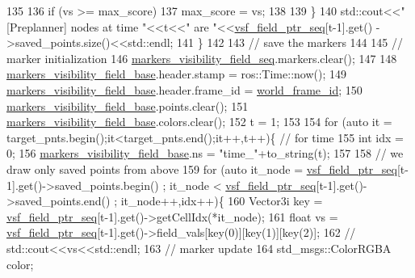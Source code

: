 \begin{DoxyCode}
135                     
136                     \textcolor{keywordflow}{if} (vs >= max\_score)
137                         max\_score = vs;
138 
139                 \}
140         std::cout<<\textcolor{stringliteral}{"[Preplanner] nodes at time "}<<t<<\textcolor{stringliteral}{" are "}<<\hyperlink{class_preplanner_aab0f91e34b86eaa581c7642ba5059308}{vsf\_field\_ptr\_seq}[t-1].get()
      ->saved\_points.size()<<std::endl;
141     \}
142 
143     \textcolor{comment}{// save the markers}
144 
145     \textcolor{comment}{// marker initialization     }
146     \hyperlink{class_preplanner_abcee90044b5d5935168ed132e3dfc8a6}{markers\_visibility\_field\_seq}.markers.clear();    
147 
148     \hyperlink{class_preplanner_a9c4d6a5e43241831b0ad11bdaf99ab16}{markers\_visibility\_field\_base}.header.stamp = ros::Time::now();
149     \hyperlink{class_preplanner_a9c4d6a5e43241831b0ad11bdaf99ab16}{markers\_visibility\_field\_base}.header.frame\_id = 
      \hyperlink{class_preplanner_a08cb79c25bd4ded139a572672e4492cd}{world\_frame\_id};
150     \hyperlink{class_preplanner_a9c4d6a5e43241831b0ad11bdaf99ab16}{markers\_visibility\_field\_base}.points.clear();
151     \hyperlink{class_preplanner_a9c4d6a5e43241831b0ad11bdaf99ab16}{markers\_visibility\_field\_base}.colors.clear();
152     t = 1;
153 
154     \textcolor{keywordflow}{for} (\textcolor{keyword}{auto} it = target\_pnts.begin();it<target\_pnts.end();it++,t++)\{ \textcolor{comment}{// for time}
155         \textcolor{keywordtype}{int} idx = 0;
156         \hyperlink{class_preplanner_a9c4d6a5e43241831b0ad11bdaf99ab16}{markers\_visibility\_field\_base}.ns = \textcolor{stringliteral}{"time\_"}+to\_string(t);
157 
158         \textcolor{comment}{// we draw only saved points from above }
159         \textcolor{keywordflow}{for} (\textcolor{keyword}{auto} it\_node = \hyperlink{class_preplanner_aab0f91e34b86eaa581c7642ba5059308}{vsf\_field\_ptr\_seq}[t-1].\textcolor{keyword}{get}()->saved\_points.begin() ; it\_node <
       \hyperlink{class_preplanner_aab0f91e34b86eaa581c7642ba5059308}{vsf\_field\_ptr\_seq}[t-1].get()->saved\_points.end() ; it\_node++,idx++)\{
160             Vector3i key = \hyperlink{class_preplanner_aab0f91e34b86eaa581c7642ba5059308}{vsf\_field\_ptr\_seq}[t-1].get()->getCellIdx(*it\_node);
161             \textcolor{keywordtype}{float} vs = \hyperlink{class_preplanner_aab0f91e34b86eaa581c7642ba5059308}{vsf\_field\_ptr\_seq}[t-1].get()->field\_vals[key(0)][key(1)][key(2)];
162             \textcolor{comment}{// std::cout<<vs<<std::endl;}
163             \textcolor{comment}{// marker update}
164             std\_msgs::ColorRGBA color;

\end{DoxyCode}
